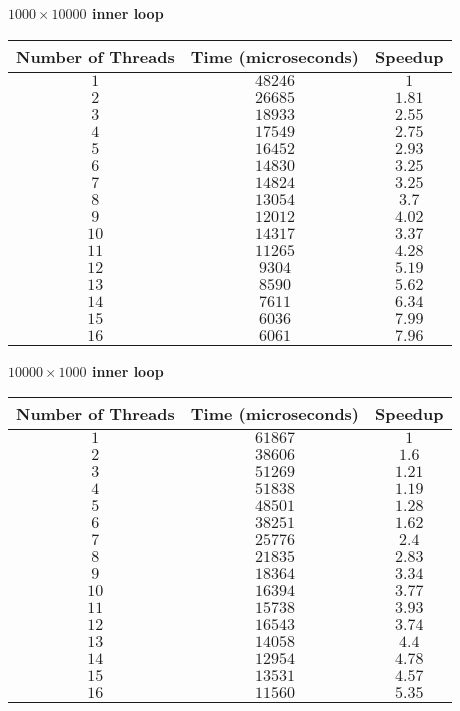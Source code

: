 \documentclass[10pt]{article} %
\begin{document}
\begin{enumerate}[1.]
\begin{enumerate}[(a)]
\textbf{$1000 \times 10000$ inner loop}
\begin{center}
\begin{tabular}{| c | c | c |}
\hline
Number of Threads & Time (microseconds) & Speedup \\
\hline
$1$ & $48246$ & $1$ \\
$2$ & $26685$ & $1.81$ \\
$3$ & $18933$ & $2.55$ \\
$4$ & $17549$ & $2.75$ \\
$5$ & $16452$ & $2.93$ \\
$6$ & $14830$ & $3.25$ \\
$7$ & $14824$ & $3.25$ \\
$8$ & $13054$ & $3.7$ \\
$9$ & $12012$ & $4.02$ \\
$10$ & $14317$ & $3.37$ \\
$11$ & $11265$ & $4.28$ \\
$12$ & $9304$ & $5.19$ \\
$13$ & $8590$ & $5.62$ \\
$14$ & $7611$ & $6.34$ \\
$15$ & $6036$ & $7.99$ \\
$16$ & $6061$ & $7.96$ \\
\hline
\end{tabular}
\end{center}

\textbf{$10000 \times 1000$ inner loop}
\begin{center}
\begin{tabular}{| c | c | c |}
\hline
Number of Threads & Time (microseconds) & Speedup \\
\hline
$1$ & $61867$ & $1$ \\
$2$ & $38606$ & $1.6$ \\
$3$ & $51269$ & $1.21$ \\
$4$ & $51838$ & $1.19$ \\
$5$ & $48501$ & $1.28$ \\
$6$ & $38251$ & $1.62$ \\
$7$ & $25776$ & $2.4$ \\
$8$ & $21835$ & $2.83$ \\
$9$ & $18364$ & $3.34$ \\
$10$ & $16394$ & $3.77$ \\
$11$ & $15738$ & $3.93$ \\
$12$ & $16543$ & $3.74$ \\
$13$ & $14058$ & $4.4$ \\
$14$ & $12954$ & $4.78$ \\
$15$ & $13531$ & $4.57$ \\
$16$ & $11560$ & $5.35$ \\
\hline
\end{tabular}
\end{center}


\end{enumerate}
\end{enumerate}
\end{document}
